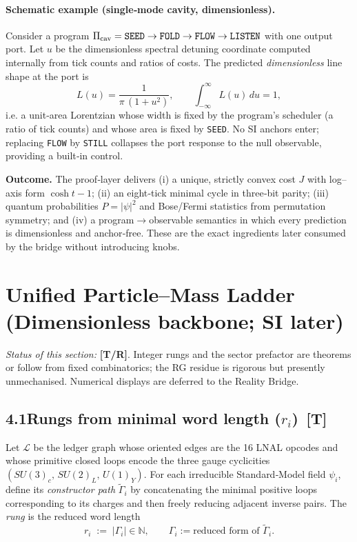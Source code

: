 \documentclass[11pt]{article}
\begin{document}
\paragraph{Schematic example (single‑mode cavity, dimensionless).}
Consider a program \(\Pi_{\rm cav}=\texttt{SEED}\to\texttt{FOLD}\to\texttt{FLOW}\to\texttt{LISTEN}\) with one output port. Let \(u\) be the dimensionless spectral detuning coordinate computed internally from tick counts and ratios of costs. The predicted \emph{dimensionless} line shape at the port is
\[
L(u)=\frac{1}{\pi\,(1+u^{2})},\qquad \int_{-\infty}^{\infty} L(u)\,du=1,
\]
i.e. a unit‑area Lorentzian whose width is fixed by the program’s scheduler (a ratio of tick counts) and whose area is fixed by \texttt{SEED}. No SI anchors enter; replacing \texttt{FLOW} by \texttt{STILL} collapses the port response to the null observable, providing a built‑in control.

\bigskip

\noindent\textbf{Outcome.} The proof‑layer delivers (i) a unique, strictly convex cost \(J\) with log–axis form \(\cosh t-1\); (ii) an eight‑tick minimal cycle in three‑bit parity; (iii) quantum probabilities \(P=|\psi|^{2}\) and Bose/Fermi statistics from permutation symmetry; and (iv) a program\(\to\)observable semantics in which every prediction is dimensionless and anchor‑free. These are the exact ingredients later consumed by the bridge without introducing knobs.

\section{Unified Particle–Mass Ladder (Dimensionless backbone; SI later)}
\emph{Status of this section:} \textbf{[T/R]}. Integer rungs and the sector prefactor are theorems or follow from fixed combinatorics; the RG residue is rigorous but presently unmechanised. Numerical displays are deferred to the Reality Bridge.%

\subsection*{4.1\quad Rungs from minimal word length \texorpdfstring{(\(r_i\))}{(r_i)} \,[T]}
Let \(\mathscr L\) be the ledger graph whose oriented edges are the 16 LNAL opcodes and whose primitive closed loops encode the three gauge cyclicities \((SU(3)_c,\,SU(2)_L,\,U(1)_Y)\). For each irreducible Standard‑Model field \(\psi_i\), define its \emph{constructor path} \(\widetilde\Gamma_i\) by concatenating the minimal positive loops corresponding to its charges and then freely reducing adjacent inverse pairs. The \emph{rung} is the reduced word length
\[
  r_i\;:=\;|\Gamma_i|\in\mathbb N,
  \qquad \Gamma_i:=\text{reduced form of }\widetilde\Gamma_i.
\]
\end{document}
